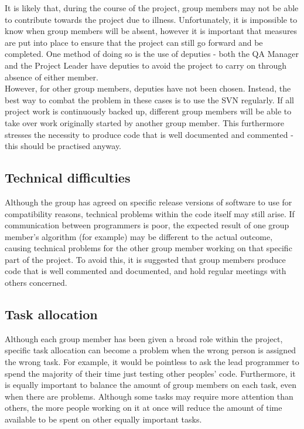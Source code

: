 \documentclass[a4paper]{article}
\begin{document}
It is likely that, during the course of the project, group members may not be able to contribute towards the project due to illness. Unfortunately, it is impossible to know when group members will be absent, however it is important that measures are put into place to ensure that the project can still go forward and be completed. One method of doing so is the use of deputies - both the QA Manager and the Project Leader have deputies to avoid the project to carry on through absence of either member.\\

However, for other group members, deputies have not been chosen. Instead, the best way to combat the problem in these cases is to use the SVN regularly. If all project work is continuously backed up, different group members will be able to take over work originally started by another group member. This furthermore stresses the necessity to produce code that is well documented and commented - this should be practised anyway.

\subsection{Technical difficulties}

Although the group has agreed on specific release versions of software to use for compatibility reasons, technical problems within the code itself may still arise. If communication between programmers is poor, the expected result of one group member's algorithm (for example) may be different to the actual outcome, causing technical problems for the other group member working on that specific part of the project. To avoid this, it is suggested that group members produce code that is well commented and documented, and hold regular meetings with others concerned.

\subsection{Task allocation}

Although each group member has been given a broad role within the project, specific task allocation can become a problem when the wrong person is assigned the wrong task. For example, it would be pointless to ask the lead programmer to spend the majority of their time just testing other peoples' code. Furthermore, it is equally important to balance the amount of group members on each task, even when there are problems. Although some tasks may require more attention than others, the more people working on it at once will reduce the amount of time available to be spent on other equally important tasks.
\clearpage
\end{document}
